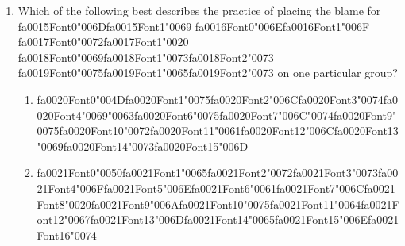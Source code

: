 \documentclass[12pt]{article}
\begin{document}
\begin{enumerate}[label=\arabic*.]
\begin{enumerate}[label=(\alph*)]
    \item {\char"0061}{\csname fa0011Font1\endcsname\char"0020}{\csname fa0011Font2\endcsname\char"0064}{\csname fa0011Font3\endcsname\char"0065}{\csname fa0011Font4\endcsname\char"0063} {\csname fa0012Font0\endcsname\char"0065}{\csname fa0012Font1\endcsname\char"006E}{\csname fa0012Font2\endcsname\char"0074}{\csname fa0012Font3\endcsname\char"0072}{\csname fa0012Font4\endcsname\char"0061}{\csname fa0012Font5\endcsname\char"006C} {\csname fa0013Font0\endcsname\char"0069}{\csname fa0013Font1\endcsname\char"007A}{\csname fa0013Font2\endcsname\char"0065}{\csname fa0013Font3\endcsname\char"0064}{\csname fa0013Font4\endcsname\char"0020}{\csname fa0013Font5\endcsname\char"0065} {\csname fa0014Font0\endcsname\char"0063}{\char"006F}{\char"006E}{\char"006F}{\char"006D}{\char"0079}
\end{enumerate}
\item Which of the following best describes the practice of placing the blame for {\csname fa0015Font0\endcsname\char"006D}{\csname fa0015Font1\endcsname\char"0069} {\csname fa0016Font0\endcsname\char"006E}{\csname fa0016Font1\endcsname\char"006F} {\csname fa0017Font0\endcsname\char"0072}{\csname fa0017Font1\endcsname\char"0020} {\csname fa0018Font0\endcsname\char"0069}{\csname fa0018Font1\endcsname\char"0073}{\csname fa0018Font2\endcsname\char"0073} {\csname fa0019Font0\endcsname\char"0075}{\csname fa0019Font1\endcsname\char"0065}{\csname fa0019Font2\endcsname\char"0073} on one particular group?
\begin{enumerate}[label=(\alph*)]
    \item {\csname fa0020Font0\endcsname\char"004D}{\csname fa0020Font1\endcsname\char"0075}{\csname fa0020Font2\endcsname\char"006C}{\csname fa0020Font3\endcsname\char"0074}{\csname fa0020Font4\endcsname\char"0069}{\char"0063}{\csname fa0020Font6\endcsname\char"0075}{\csname fa0020Font7\endcsname\char"006C}{\char"0074}{\csname fa0020Font9\endcsname\char"0075}{\csname fa0020Font10\endcsname\char"0072}{\csname fa0020Font11\endcsname\char"0061}{\csname fa0020Font12\endcsname\char"006C}{\csname fa0020Font13\endcsname\char"0069}{\csname fa0020Font14\endcsname\char"0073}{\csname fa0020Font15\endcsname\char"006D}
    \item {\csname fa0021Font0\endcsname\char"0050}{\csname fa0021Font1\endcsname\char"0065}{\csname fa0021Font2\endcsname\char"0072}{\csname fa0021Font3\endcsname\char"0073}{\csname fa0021Font4\endcsname\char"006F}{\csname fa0021Font5\endcsname\char"006E}{\csname fa0021Font6\endcsname\char"0061}{\csname fa0021Font7\endcsname\char"006C}{\csname fa0021Font8\endcsname\char"0020}{\csname fa0021Font9\endcsname\char"006A}{\csname fa0021Font10\endcsname\char"0075}{\csname fa0021Font11\endcsname\char"0064}{\csname fa0021Font12\endcsname\char"0067}{\csname fa0021Font13\endcsname\char"006D}{\csname fa0021Font14\endcsname\char"0065}{\csname fa0021Font15\endcsname\char"006E}{\csname fa0021Font16\endcsname\char"0074}

\end{enumerate}
\end{enumerate}
\end{document}
